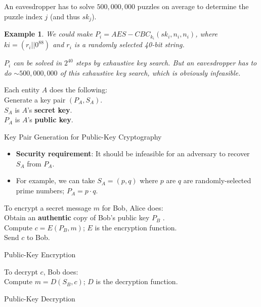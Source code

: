 \documentclass[12pt,titlepage]{article}
\newtheorem{protoexample}[prototheorem]{Example}
\newenvironment{example}
{\colorlet{shadecolor}{red!15}\begin{shaded}\begin{protoexample}\normalfont}{\end{protoexample}\end{shaded}}
\begin{document}
An eavesdropper has to solve $500,000,000$ puzzles on average to determine the puzzle index $j$ (and thus $sk_j$).

\begin{example}
	We could make $P_i = AES-CBC_{k_i} (sk_i , n_i , n_i )$, where $k i = (r_i || 0^{88})$ and $r_i$ is a randomly selected 40-bit string.

	$P_i$ can be solved in $2^{40}$ steps by exhaustive key search. But an eavesdropper has to do $\sim 500,000,000$ of this exhaustive key search, which is obviously infeasible. 
\end{example}

\begin{algorithm}
	Each entity $A$ does the following:\\
	Generate a key pair $(P_A , S_A)$.\\
	$S_A$ is $A$’s \textbf{secret key}.\\
	$P_A$ is $A$’s \textbf{public key}.
	\caption{Key Pair Generation for Public-Key Cryptography}
\end{algorithm}

\begin{itemize}
	\item \textbf{Security requirement}: It should be infeasible for an adversary to recover $S_A$ from $P_A$.
	\item For example, we can take $S_A = (p, q)$ where $p$ are $q$ are randomly-selected prime numbers; $P_A = p \cdot q$.
\end{itemize}

\begin{algorithm}
	To encrypt a secret message $m$ for Bob, Alice does:\\
	Obtain an \textbf{authentic} copy of Bob’s public key $P_B$ .\\
	Compute $c = E(P_B , m)$; $E$ is the encryption function.\\
	Send $c$ to Bob.
	\caption{Public-Key Encryption}
\end{algorithm}

\begin{algorithm}
	To decrypt $c$, Bob does:\\
	Compute $m = D(S_B , c)$; $D$ is the decryption function.
	\caption{Public-Key Decryption}
\end{algorithm}
\end{document}
